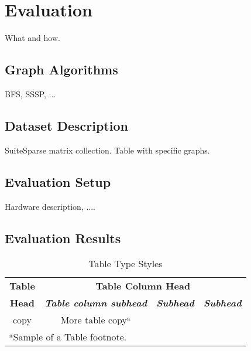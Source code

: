 \section{Evaluation}

What and how. 



\subsection{Graph Algorithms}

BFS, SSSP, ...

\subsection{Dataset Description}

SuiteSparse matrix collection. Table with specific graphs.

\subsection{Evaluation Setup}

Hardware description, ....

\subsection{Evaluation Results}

\begin{table}[htbp]
    \caption{Table Type Styles}
    \begin{center}
    \begin{tabular}{|c|c|c|c|}
    \hline
    \textbf{Table}&\multicolumn{3}{|c|}{\textbf{Table Column Head}} \\
    \cline{2-4} 
    \textbf{Head} & \textbf{\textit{Table column subhead}}& \textbf{\textit{Subhead}}& \textbf{\textit{Subhead}} \\
    \hline
    copy& More table copy$^{\mathrm{a}}$& &  \\
    \hline
    \multicolumn{4}{l}{$^{\mathrm{a}}$Sample of a Table footnote.}
    \end{tabular}
    \label{tab1}
    \end{center}
    \end{table}
    
    
    